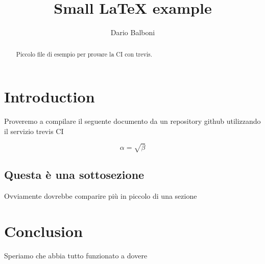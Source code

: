 \documentclass{article}
\begin{document}
	\title{Small \LaTeX{} example}
	\author{Dario Balboni}
	\maketitle

	\begin{abstract}
		Piccolo file di esempio per provare la CI con trevis.
	\end{abstract}

	\section{Introduction}
		Proveremo a compilare il seguente documento da un repository
		github utilizzando il servizio trevis CI

	\begin{equation}
	    \label{dummy_equation}
	    \alpha = \sqrt{ \beta }
	\end{equation}

	\subsection{Questa è una sottosezione}
		Ovviamente dovrebbe comparire più in piccolo di una sezione

	\section{Conclusion}
		Speriamo che abbia tutto funzionato a dovere
\end{document}
